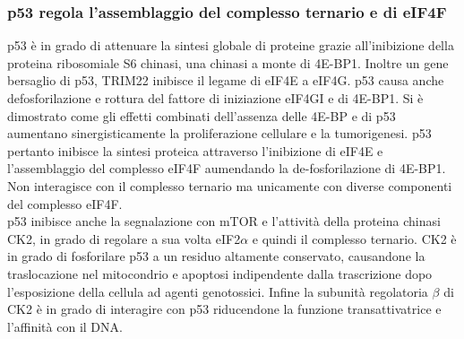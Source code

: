     \subsubsection{p53 regola l'assemblaggio del complesso ternario e di eIF4F}
    p53 \`e in grado di attenuare la sintesi globale di proteine grazie all'inibizione della proteina ribosomiale S6 chinasi, una chinasi a monte di 4E-BP1.
    Inoltre un gene bersaglio di p53, TRIM22 inibisce il legame di eIF4E a eIF4G.
    p53 causa anche defosforilazione e rottura del fattore di iniziazione eIF4GI e di 4E-BP1.
    Si \`e dimostrato come gli effetti combinati dell'assenza delle 4E-BP e di p53 aumentano sinergisticamente la proliferazione cellulare e la tumorigenesi.
    p53 pertanto inibisce la sintesi proteica attraverso l'inibizione di eIF4E e l'assemblaggio del complesso eIF4F aumendando la de-fosforilazione di 4E-BP1.
    Non interagisce con il complesso ternario ma unicamente con diverse componenti del complesso eIF4F.\\
    p53 inibisce anche la segnalazione con mTOR e l'attivit\`a della proteina chinasi CK2, in grado di regolare a sua volta eIF2$\alpha$ e quindi il complesso ternario.
    CK2 \`e in grado di fosforilare p53 a un residuo altamente conservato, causandone la traslocazione nel mitocondrio e apoptosi indipendente dalla trascrizione dopo l'esposizione della cellula ad agenti genotossici.
    Infine la subunit\`a regolatoria $\beta$ di CK2 \`e in grado di interagire con p53 riducendone la funzione transattivatrice e l'affinit\`a con il DNA.


